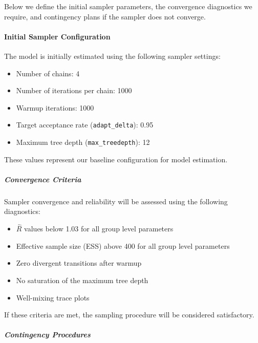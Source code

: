 \documentclass[
]{article}
\providecommand{\tightlist}{%
  \setlength{\itemsep}{0pt}\setlength{\parskip}{0pt}}
\begin{document}
Below we define the initial sampler parameters, the convergence
diagnostics we require, and contingency plans if the sampler does not
converge.

\paragraph{Initial Sampler
Configuration}\label{initial-sampler-configuration}

The model is initially estimated using the following sampler settings:

\begin{itemize}
\tightlist
\item
  Number of chains: 4\\
\item
  Number of iterations per chain: 1000\\
\item
  Warmup iterations: 1000
\item
  Target acceptance rate (\texttt{adapt\_delta}): 0.95\\
\item
  Maximum tree depth (\texttt{max\_treedepth}): 12
\end{itemize}

These values represent our baseline configuration for model estimation.

\subparagraph{Convergence Criteria}\label{convergence-criteria}

Sampler convergence and reliability will be assessed using the following
diagnostics:

\begin{itemize}
\tightlist
\item
  \(\hat{R}\) values below 1.03 for all group level parameters\\
\item
  Effective sample size (ESS) above 400 for all group level parameters\\
\item
  Zero divergent transitions after warmup\\
\item
  No saturation of the maximum tree depth\\
\item
  Well-mixing trace plots
\end{itemize}

If these criteria are met, the sampling procedure will be considered
satisfactory.

\subparagraph{Contingency Procedures}\label{contingency-procedures}
\end{document}
